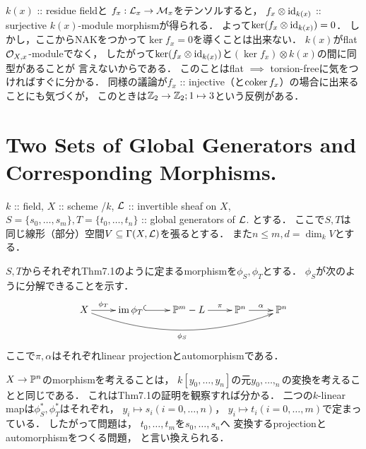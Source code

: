 \documentclass[a4paper]{jsarticle}
\begin{document}
    \begin{Remark}
        $k(x)$ :: residue fieldと
        $f_x: \mathcal{L}_x \to \mathcal{M}_x$をテンソルすると，
        $f_x \otimes \mathrm{id}_{k(x)}$ :: surjective $k(x)$-module morphismが得られる．
        よって$\ker (f_x \otimes \mathrm{id}_{k(x)})=0$．
        しかし，ここからNAKをつかって$\ker f_x=0$を導くことは出来ない．
        $k(x)$がflat $\mathcal{O}_{X,x}$-moduleでなく，
        したがって$\ker (f_x \otimes \mathrm{id}_{k(x)})$と$(\ker f_x) \otimes k(x)$の間に同型があることが
        言えないからである．
        このことはflat $\implies$ torsion-freeに気をつければすぐに分かる．
        同様の議論が$f_x$ :: injective（と$\operatorname{coker} f_x$）の場合に出来ることにも気づくが，
        このときは$\mathbb{Z}_2 \to \mathbb{Z}_2; 1 \mapsto 3$という反例がある．
    \end{Remark}

\section{Two Sets of Global Generators and Corresponding Morphisms.} %
    $k$ :: field,
    $X$ :: scheme /$k$,
    $\mathcal{L}$ :: invertible sheaf on $X$,
    $S=\{s_0,\dots,s_m\}, T=\{t_0,\dots,t_n\}$ :: global generators of $\mathcal{L}$.
    とする．
    ここで$S,T$は
    同じ線形（部分）空間$V \subseteq \Gamma(X, \mathcal{L})$を張るとする．
    また$n \leq m, d=\dim_k V$とする．

    $S,T$からそれぞれThm7.1のように定まるmorphismを$\phi_S, \phi_T$とする．
    $\phi_S$が次のように分解できることを示す．
    \[
        \xymatrix
        {
            X \ar@/_20pt/[rrrr]_-{\phi_S}\ar[r]^-{\phi_T}&
                \im \phi_T \ar@{^{(}->}[r]& \proj^m-L \ar[r]^-{\pi}&
                    \proj^n \ar[r]^-{\alpha}& \proj^n
        }
    \]
    ここで$\pi, \alpha$はそれぞれlinear projectionとautomorphismである．

    $X \to \mathbb{P}^n$のmorphismを考えることは，
    $k[y_0,\dots, y_n]$の元$y_0,\dots,_n$の変換を考えることと同じである．
    これはThm7.1の証明を観察すれば分かる．
    二つの$k$-linear mapは$\phi_S^*, \phi_T^*$はそれぞれ，
    $y_i \mapsto s_i (i=0,\dots,n)$，
    $y_i \mapsto t_i (i=0,\dots,m)$で定まっている．
    したがって問題は，
    $t_0,\dots,t_m$を$s_0,\dots,s_n$へ
    変換するprojectionとautomorphismをつくる問題，
    と言い換えられる．
\end{document}
